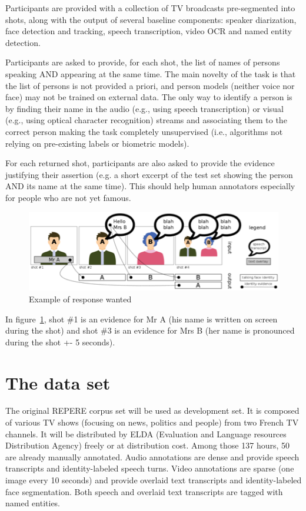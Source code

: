 \documentclass{acm_proc_article-me}
\begin{document}
Participants are provided with a collection of TV broadcasts pre-segmented into shots, along with the output of several baseline components: speaker diarization, face detection and tracking, speech transcription, video OCR and named entity detection. 

Participants are asked to provide, for each shot, the list of names of persons speaking AND appearing at the same time. The main novelty of the task is that the list of persons is not provided a priori, and person models (neither voice nor face) may not be trained on external data. The only way to identify a person is by finding their name in the audio (e.g., using speech transcription) or visual (e.g., using optical character recognition) streams and associating them to the correct person making the task completely unsupervised (i.e., algorithms not relying on pre-existing labels or biometric models). 

For each returned shot, participants are also asked to provide the evidence justifying their assertion (e.g. a short excerpt of the test set showing the person AND its name at the same time). This should help human annotators especially for people who are not yet famous. 

\begin{figure}[htb]
 \center 
 \includegraphics[width=1\linewidth]{figs/evidence.png}
 \centering
 \caption {Example of response wanted}
 \label{fig:evidence}
\end{figure}

In figure~\ref{fig:evidence}, shot \#1 is an evidence for Mr A (his name is written on screen during the shot) and shot \#3 is an evidence for Mrs B (her name is pronounced during the shot +- 5 seconds).

\section{The data set}

The original REPERE corpus set will be used as development set. It is composed of various TV shows (focusing on news, politics and people) from two French TV channels. It will be distributed by ELDA (Evaluation and Language resources Distribution Agency) freely or at distribution cost. Among those 137 hours, 50 are already manually annotated. Audio annotations are dense and provide speech transcripts and identity-labeled speech turns. Video annotations are sparse (one image every 10 seconds) and provide overlaid text transcripts and identity-labeled face segmentation. Both speech and overlaid text transcripts are tagged with named entities.
\end{document}
